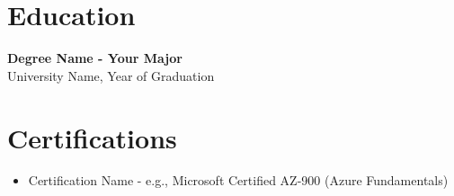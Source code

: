 \documentclass[a4paper,10pt]{article}
\begin{document}
\section*{Education}
\textbf{{Degree Name} - {Your Major}} \\
{University Name}, {Year of Graduation}

\section*{Certifications}
\begin{itemize}[left=0pt, label=$\bullet$, topsep=3pt]
    \item {Certification Name - e.g., Microsoft Certified AZ-900 (Azure Fundamentals)}
\end{itemize}
\end{document}
